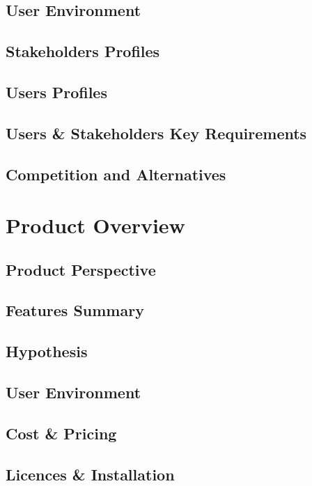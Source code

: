 \documentclass[12pt,a4paper,oneside, titlepage]{article}
\begin{document}
	\subsection{User Environment}
	\subsection{Stakeholders Profiles}
	\subsection{Users Profiles}
	\subsection{Users \& Stakeholders Key Requirements}
	\subsection{Competition and Alternatives}
	
    \newpage
	\section{Product Overview}
	\subsection{Product Perspective}
	\subsection{Features Summary}
	\subsection{Hypothesis}
	\subsection{User Environment}
	\subsection{Cost \& Pricing}
	\subsection{Licences \& Installation}
	
    \newpage
\end{document}
